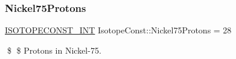 \subsubsection{\texorpdfstring{Nickel75\+Protons}{Nickel75Protons}}
{\footnotesize\ttfamily \mbox{\hyperlink{group___isotope_const-_macros_ga5f18360b3e99483a35c32d789e62621c}{I\+S\+O\+T\+O\+P\+E\+C\+O\+N\+S\+T\+\_\+\+I\+NT}} Isotope\+Const\+::\+Nickel75\+Protons = 28}

\$ \$ Protons in Nickel-\/75. 